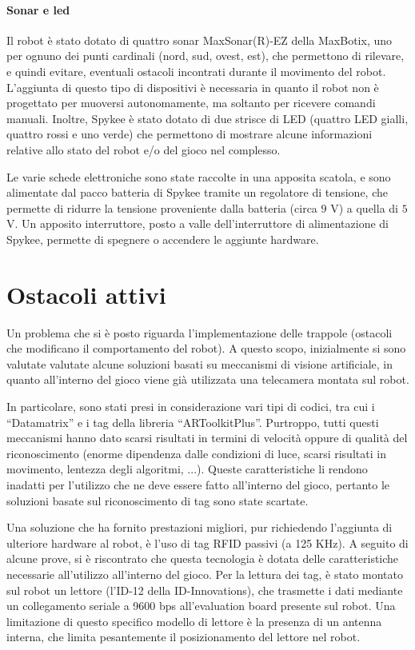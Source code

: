 \paragraph{Sonar e led} Il robot è stato dotato di quattro sonar MaxSonar(R)-EZ della MaxBotix, uno per ognuno dei punti cardinali (nord, sud, ovest, est), che permettono di rilevare, e quindi evitare, eventuali ostacoli incontrati durante il movimento del robot. L'aggiunta di questo tipo di dispositivi è necessaria in quanto il robot non è progettato per muoversi autonomamente, ma soltanto per ricevere comandi manuali. Inoltre, Spykee è stato dotato di due strisce di LED (quattro LED gialli, quattro rossi e uno verde) che permettono di mostrare alcune informazioni relative allo stato del robot e/o del gioco nel complesso.


Le varie schede elettroniche sono state raccolte in una apposita scatola, e sono alimentate dal pacco batteria di Spykee tramite un regolatore di tensione, che permette di ridurre la tensione proveniente dalla batteria (circa $9$ V) a quella di $5$ V. Un apposito interruttore, posto a valle dell'interruttore di alimentazione di Spykee, permette di spegnere o accendere le aggiunte hardware.

\section{Ostacoli attivi}
Un problema che si è posto riguarda l'implementazione delle trappole (ostacoli che modificano il comportamento del robot). A questo scopo, inizialmente si sono valutate valutate alcune soluzioni basati su meccanismi di visione artificiale, in quanto all'interno del gioco viene già utilizzata una telecamera montata sul robot.

In particolare, sono stati presi in considerazione vari tipi di codici, tra cui i ``Datamatrix'' e i tag della libreria ``ARToolkitPlus''. Purtroppo, tutti questi meccanismi hanno dato scarsi risultati in termini di velocità oppure di qualità del riconoscimento (enorme dipendenza dalle condizioni di luce, scarsi risultati in movimento, lentezza degli algoritmi, ...). Queste caratteristiche li rendono inadatti per l'utilizzo che ne deve essere fatto all'interno del gioco, pertanto le soluzioni basate sul riconoscimento di tag sono state scartate.

Una soluzione che ha fornito prestazioni migliori, pur richiedendo l'aggiunta di ulteriore hardware al robot, è l'uso di tag RFID passivi (a 125 KHz). A seguito di alcune prove, si è riscontrato che questa tecnologia è dotata delle caratteristiche necessarie all'utilizzo all'interno del gioco. Per la lettura dei tag, è stato montato sul robot un lettore (l'ID-12 della ID-Innovations), che trasmette i dati mediante un collegamento seriale a 9600 bps all'evaluation board presente sul robot. Una limitazione di questo specifico modello di lettore è la presenza di un antenna interna, che limita pesantemente il posizionamento del lettore nel robot.

